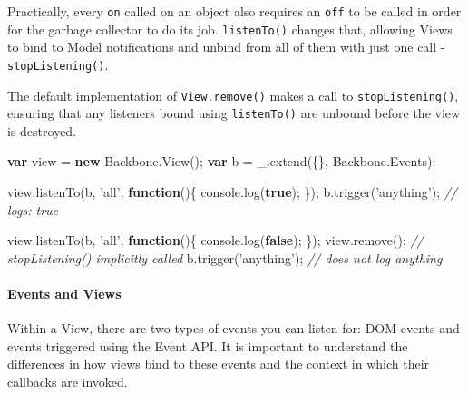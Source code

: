 \documentclass[9pt]{book}
\newenvironment{Shaded}{}{}
\newcommand{\KeywordTok}[1]{\textcolor[rgb]{0.00,0.44,0.13}{\textbf{{#1}}}}
\newcommand{\StringTok}[1]{\textcolor[rgb]{0.25,0.44,0.63}{{#1}}}
\newcommand{\CommentTok}[1]{\textcolor[rgb]{0.38,0.63,0.69}{\textit{{#1}}}}
\newcommand{\OtherTok}[1]{\textcolor[rgb]{0.00,0.44,0.13}{{#1}}}
\newcommand{\FunctionTok}[1]{\textcolor[rgb]{0.02,0.16,0.49}{{#1}}}
\newcommand{\NormalTok}[1]{{#1}}
\begin{document}
Practically, every \texttt{on} called on an object also requires an
\texttt{off} to be called in order for the garbage collector to do its
job. \texttt{listenTo()} changes that, allowing Views to bind to Model
notifications and unbind from all of them with just one call -
\texttt{stopListening()}.

The default implementation of \texttt{View.remove()} makes a call to
\texttt{stopListening()}, ensuring that any listeners bound using
\texttt{listenTo()} are unbound before the view is destroyed.

\begin{Shaded}
\begin{Highlighting}[]
\KeywordTok{var} \NormalTok{view = }\KeywordTok{new} \OtherTok{Backbone}\NormalTok{.}\FunctionTok{View}\NormalTok{();}
\KeywordTok{var} \NormalTok{b = }\OtherTok{_}\NormalTok{.}\FunctionTok{extend}\NormalTok{(\{\}, }\OtherTok{Backbone}\NormalTok{.}\FunctionTok{Events}\NormalTok{);}

\OtherTok{view}\NormalTok{.}\FunctionTok{listenTo}\NormalTok{(b, }\StringTok{'all'}\NormalTok{, }\KeywordTok{function}\NormalTok{()\{ }\OtherTok{console}\NormalTok{.}\FunctionTok{log}\NormalTok{(}\KeywordTok{true}\NormalTok{); \});}
\OtherTok{b}\NormalTok{.}\FunctionTok{trigger}\NormalTok{(}\StringTok{'anything'}\NormalTok{);  }\CommentTok{// logs: true}

\OtherTok{view}\NormalTok{.}\FunctionTok{listenTo}\NormalTok{(b, }\StringTok{'all'}\NormalTok{, }\KeywordTok{function}\NormalTok{()\{ }\OtherTok{console}\NormalTok{.}\FunctionTok{log}\NormalTok{(}\KeywordTok{false}\NormalTok{); \});}
\OtherTok{view}\NormalTok{.}\FunctionTok{remove}\NormalTok{(); }\CommentTok{// stopListening() implicitly called}
\OtherTok{b}\NormalTok{.}\FunctionTok{trigger}\NormalTok{(}\StringTok{'anything'}\NormalTok{);  }\CommentTok{// does not log anything}
\end{Highlighting}
\end{Shaded}

\paragraph{Events and Views}\label{events-and-views}

Within a View, there are two types of events you can listen for: DOM
events and events triggered using the Event API. It is important to
understand the differences in how views bind to these events and the
context in which their callbacks are invoked.
\end{document}
